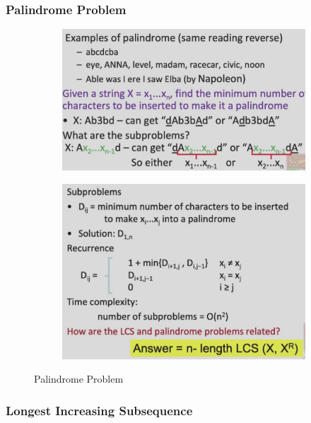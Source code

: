 \subsubsection{Palindrome Problem}

\begin{figure}[H]
    \centering
    \begin{subfigure}{0.309\textwidth}
        \centering
        \includegraphics[width=\textwidth]{pic/DAA8/Palindrome Problem}
    \end{subfigure}
    \begin{subfigure}{0.309\textwidth}
        \centering
        \includegraphics[width=\textwidth]{pic/DAA8/Palindrome Problem1}
    \end{subfigure}
    \caption{Palindrome Problem}
\end{figure}


\subsubsection{Longest Increasing Subsequence}

